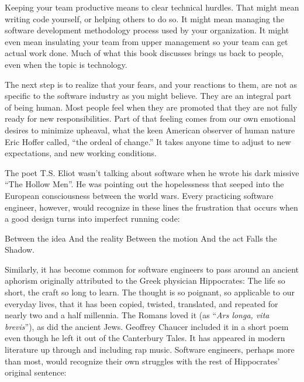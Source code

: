 Keeping your team productive means to clear technical hurdles. That might mean writing code yourself, or helping others to do so. It might mean managing the software development methodology process used by your organization. It might even mean insulating your team from upper management so your team can get actual work done. Much of what this book discusses brings us back to people, even when the topic is technology.

\vspace{20pt}
\setlength{\fboxsep}{10pt}%

The next step is to realize that your fears, and your reactions to them, are not as specific to the software industry as you might believe. They are an integral part of being human. Most people feel when they are promoted that they are not fully ready for new responsibilities. Part of that feeling comes from our own emotional desires to minimize upheaval, what the keen American observer of human nature Eric Hoffer called, ``the ordeal of change.'' It takes anyone time to adjust to new expectations, and new working conditions.

The poet T.S. Eliot wasn't talking about software when he wrote his dark missive ``The Hollow Men''. He was pointing out the hopelessness that seeped into the European consciousness between the world wars. Every practicing software engineer, however, would recognize in these lines the frustration that occurs when a good design turns into imperfect running code:

\begin{verso}
Between the idea
And the reality
Between the motion
And the act
Falls the Shadow.
\end{verso}

Similarly, it has become common for software engineers to pass around an ancient aphorism originally attributed to the Greek physician Hippocrates: The life so short, the craft so long to learn. The thought is so poignant, so applicable to our everyday lives, that it has been copied, twisted, translated, and repeated for nearly two and a half millennia. The Romans loved it (as ``\textit{Ars longa, vita brevis}''), as did the ancient Jews. Geoffrey Chaucer included it in a short poem even though he left it out of the Canterbury Tales. It has appeared in modern literature up through and including rap music. Software engineers, perhaps more than most, would recognize their own struggles with the rest of Hippocrates' original sentence:

